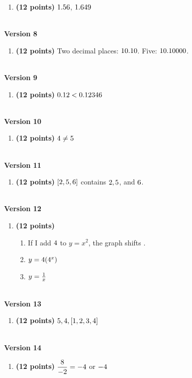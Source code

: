 \documentclass[12pt]{amsart}
\begin{document}
\begin{enumerate}[resume]
\item {\bf (12 points)} 
 $1.56$, $1.649$ 
\vfill 
 \end{enumerate}$ $ \\ {\bf Version 8} \\\begin{enumerate}[resume]
\item {\bf (12 points)} 
 Two decimal places: $10.10$. Five: $10.10000$. 
\vfill 
 \end{enumerate}$ $ \\ {\bf Version 9} \\\begin{enumerate}[resume]
\item {\bf (12 points)} 
 $0.12 < 0.12346$ 
\vfill 
 \end{enumerate}$ $ \\ {\bf Version 10} \\\begin{enumerate}[resume]
\item {\bf (12 points)} 
 $4 \neq 5$ 
\vfill 
 \end{enumerate}$ $ \\ {\bf Version 11} \\\begin{enumerate}[resume]
\item {\bf (12 points)} 
 $[2, 5, 6]$ contains $2,5$, and $6$. 
\vfill 
 \end{enumerate}$ $ \\ {\bf Version 12} \\\begin{enumerate}[resume]
\item {\bf (12 points)} 
 \begin{enumerate}
\item If I add $4$ to $y=x^2$, the graph shifts .
\item $y = \ifthenelse{\athreethree = 1}{4^x}{\athreethree(4^x)}$
\item $y = \ifthenelse{\topthreethree = 1}{x}{\frac{1}{x}}$
\end{enumerate}

\vfill 
 \end{enumerate}$ $ \\ {\bf Version 13} \\\begin{enumerate}[resume]
\item {\bf (12 points)} 
 $5, 4, [1, 2, 3, 4]$ 
\vfill 
 \end{enumerate}$ $ \\ {\bf Version 14} \\\begin{enumerate}[resume]
\item {\bf (12 points)} 
 $\dfrac{8}{-2} = -4$ or $\displaystyle -4$ 


\end{enumerate}
\end{document}
